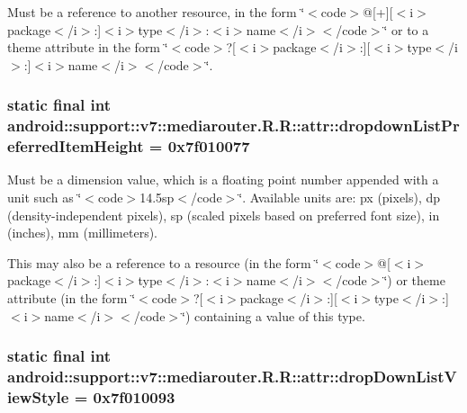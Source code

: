 Must be a reference to another resource, in the form \char`\"{}$<$code$>$@\mbox{[}+\mbox{]}\mbox{[}$<$i$>$package$<$/i$>$:\mbox{]}$<$i$>$type$<$/i$>$:$<$i$>$name$<$/i$>$$<$/code$>$\char`\"{} or to a theme attribute in the form \char`\"{}$<$code$>$?\mbox{[}$<$i$>$package$<$/i$>$:\mbox{]}\mbox{[}$<$i$>$type$<$/i$>$:\mbox{]}$<$i$>$name$<$/i$>$$<$/code$>$\char`\"{}. \hypertarget{classandroid_1_1support_1_1v7_1_1mediarouter_1_1_r_1_1attr_f13fcea26bc28006411d4d1a2d253b01}{
\subsubsection[{dropdownListPreferredItemHeight}]{\setlength{\rightskip}{0pt plus 5cm}static final int android::support::v7::mediarouter.R.R::attr::dropdownListPreferredItemHeight = 0x7f010077}}
\label{classandroid_1_1support_1_1v7_1_1mediarouter_1_1_r_1_1attr_f13fcea26bc28006411d4d1a2d253b01}


Must be a dimension value, which is a floating point number appended with a unit such as \char`\"{}$<$code$>$14.5sp$<$/code$>$\char`\"{}. Available units are: px (pixels), dp (density-independent pixels), sp (scaled pixels based on preferred font size), in (inches), mm (millimeters). 

This may also be a reference to a resource (in the form \char`\"{}$<$code$>$@\mbox{[}$<$i$>$package$<$/i$>$:\mbox{]}$<$i$>$type$<$/i$>$:$<$i$>$name$<$/i$>$$<$/code$>$\char`\"{}) or theme attribute (in the form \char`\"{}$<$code$>$?\mbox{[}$<$i$>$package$<$/i$>$:\mbox{]}\mbox{[}$<$i$>$type$<$/i$>$:\mbox{]}$<$i$>$name$<$/i$>$$<$/code$>$\char`\"{}) containing a value of this type. \hypertarget{classandroid_1_1support_1_1v7_1_1mediarouter_1_1_r_1_1attr_950e110dac9ced7d7d708303e7dcd03c}{
\subsubsection[{dropDownListViewStyle}]{\setlength{\rightskip}{0pt plus 5cm}static final int android::support::v7::mediarouter.R.R::attr::dropDownListViewStyle = 0x7f010093}}
\label{classandroid_1_1support_1_1v7_1_1mediarouter_1_1_r_1_1attr_950e110dac9ced7d7d708303e7dcd03c}


